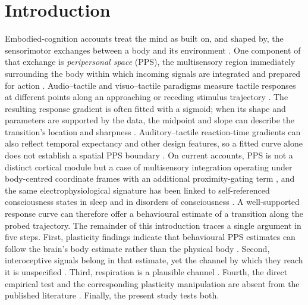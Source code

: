 \section{Introduction}

Embodied-cognition accounts treat the mind as built on, and shaped by, the sensorimotor exchanges between a body and its environment \citep{Glenberg2010, Barsalou2008, barsalou2008grounded}. One component of that exchange is \emph{peripersonal space} (PPS), the multisensory region immediately surrounding the body within which incoming signals are integrated and prepared for action \citep{rizzolatti1997space, diPellegrino2015, Serino2019, noel_2021}. Audio--tactile and visuo--tactile paradigms measure tactile responses at different points along an approaching or receding stimulus trajectory \citep{canzoneri2012dynamic, teneggi2013social}. The resulting response gradient is often fitted with a sigmoid; when its shape and parameters are supported by the data, the midpoint and slope can describe the transition's location and sharpness \citep{Bufacchi2018, Basile2024, Serino2019}. Auditory--tactile reaction-time gradients can also reflect temporal expectancy and other design features, so a fitted curve alone does not establish a spatial PPS boundary \citep{holmes2020sounds}. On current accounts, PPS is not a distinct cortical module but a case of multisensory integration operating under body-centred coordinate frames with an additional proximity-gating term \citep{noel_2018, bertoni_2025, straka2022impact}, and the same electrophysiological signature has been linked to self-referenced consciousness states in sleep and in disorders of consciousness \citep{bertoni_2026}. A well-supported response curve can therefore offer a behavioural estimate of a transition along the probed trajectory. The remainder of this introduction traces a single argument in five steps. First, plasticity findings indicate that behavioural PPS estimates can follow the brain's body estimate rather than the physical body \citep{noel_2021, Serino2019}. Second, interoceptive signals belong in that estimate, yet the channel by which they reach it is unspecified \citep{Ardizzi2018, salvato_2020, bogdanova_2021}. Third, respiration is a plausible channel \citep{saltafossi_2025, allen_2021}. Fourth, the direct empirical test and the corresponding plasticity manipulation are absent from the published literature \citep{spaccasassi_2019, karakoc_2025}. Finally, the present study tests both.

